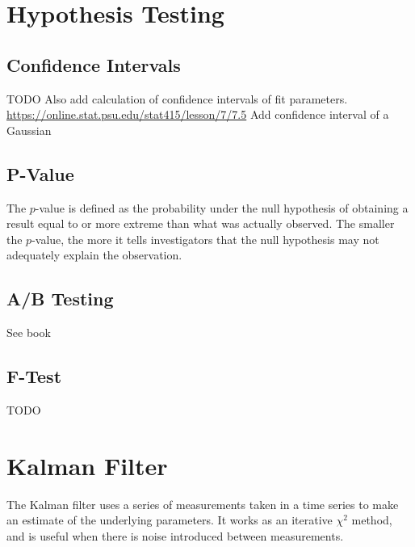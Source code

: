 \section{Hypothesis Testing}

\subsection{Confidence Intervals}
TODO
Also add calculation of confidence intervals of fit parameters.
\url{https://online.stat.psu.edu/stat415/lesson/7/7.5}
Add confidence interval of a Gaussian

\subsection{P-Value}
The $p$-value is defined as the probability under the null hypothesis of obtaining a result equal to or more extreme than what was actually observed. The smaller the $p$-value, the more it tells investigators that the null hypothesis may not adequately explain the observation.


\subsection{A/B Testing}
See book \cite{grus}


\subsection{F-Test}
TODO

\section{Kalman Filter}
The Kalman filter\cite{fruwirth} uses a series of measurements taken in a time series to make an estimate of the underlying parameters. It works as an iterative $\chi^2$ method, and is useful when there is noise introduced between measurements.

